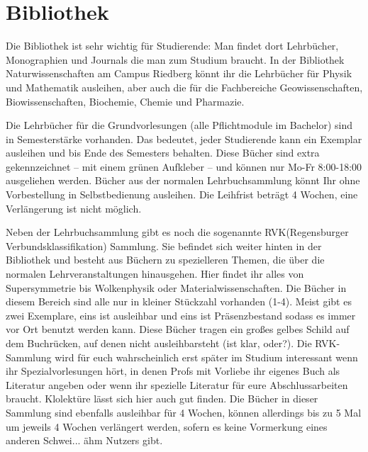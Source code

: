 \section{Bibliothek}

Die Bibliothek ist sehr wichtig für Studierende: 
Man findet dort Lehrbücher, Monographien und Journals die man zum Studium braucht.
In der Bibliothek Naturwissenschaften am Campus Riedberg könnt ihr
die Lehrbücher für Physik und Mathematik ausleihen,
aber auch die für die Fachbereiche Geowissenschaften, Biowissenschaften,
Biochemie, Chemie und Pharmazie.

Die Lehrbücher für die Grundvorlesungen (alle Pflichtmodule im Bachelor) sind in Semesterstärke vorhanden.
Das bedeutet, jeder Studierende kann ein Exemplar ausleihen
und bis Ende des Semesters behalten.
Diese Bücher sind extra gekennzeichnet -- mit einem grünen Aufkleber -- und können nur Mo-Fr 8:00-18:00 ausgeliehen werden.
Bücher aus der normalen Lehrbuchsammlung könnt Ihr ohne
Vorbestellung in Selbstbedienung ausleihen. 
Die Leihfrist beträgt 4 Wochen, eine Verlängerung ist nicht möglich.

Neben der Lehrbuchsammlung gibt es noch die sogenannte \glqq RVK\grqq  (Regensburger Verbundsklassifikation) Sammlung. Sie befindet sich weiter hinten in der Bibliothek und besteht aus Büchern zu spezielleren Themen, die über die normalen Lehrveranstaltungen hinausgehen. Hier findet ihr alles von Supersymmetrie bis Wolkenphysik oder Materialwissenschaften. Die Bücher in diesem Bereich sind alle nur in kleiner Stückzahl vorhanden (1-4). Meist gibt es zwei Exemplare, eins ist ausleihbar und eins ist Präsenzbestand sodass es immer vor Ort benutzt werden kann. Diese Bücher tragen ein großes gelbes Schild auf dem Buchrücken, auf denen \glqq nicht ausleihbar\grqq steht (ist klar, oder?). Die RVK-Sammlung wird für euch wahrscheinlich erst später im Studium interessant wenn ihr Spezialvorlesungen hört, in denen Profs mit Vorliebe ihr eigenes Buch als Literatur angeben oder wenn ihr spezielle Literatur für eure Abschlussarbeiten braucht. Klolektüre lässt sich hier auch gut finden. 
Die Bücher in dieser Sammlung sind ebenfalls ausleihbar für 4 Wochen, können allerdings bis zu 5 Mal um jeweils 4 Wochen verlängert werden, sofern es keine Vormerkung eines anderen Schwei... ähm Nutzers gibt.

